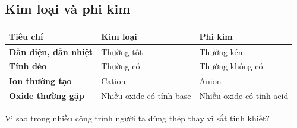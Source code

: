 \subsection{Kim loại và phi kim}

\begin{center}
\begin{tabularx}{0.96\textwidth}{>{\bfseries}C{3cm}YY}
\toprule
Tiêu chí & Kim loại & Phi kim \\
\midrule
Dẫn điện, dẫn nhiệt & Thường tốt & Thường kém \\
Tính dẻo & Thường có & Thường không có \\
Ion thường tạo & Cation & Anion \\
Oxide thường gặp & Nhiều oxide có tính base & Nhiều oxide có tính acid \\
\bottomrule
\end{tabularx}
\end{center}

\begin{tuluyen}
Vì sao trong nhiều công trình người ta dùng thép thay vì sắt tinh khiết?
\end{tuluyen}
